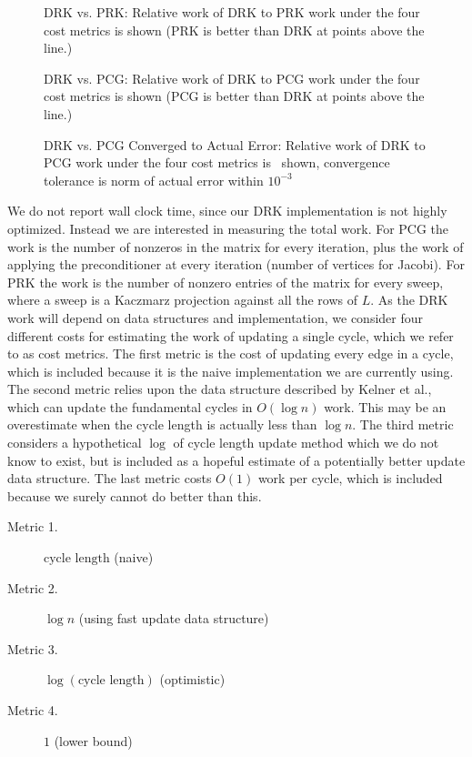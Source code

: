 \documentclass{sig-alternate}
\begin{document}
\begin{figure*}[htb!]
\centering
{}
\caption{DRK vs. PRK: Relative work of DRK to PRK work under the four cost
metrics is shown (PRK is better than DRK at points above the line.)\label{fig:prkworkcompare}}
\end{figure*}

\begin{figure*}[htb!]
\centering
{}
\caption{DRK vs. PCG: Relative work of DRK to PCG work under the four cost metrics
is shown
(PCG is better than DRK at points above the line.)\label{fig:pcgworkcompare}}
\end{figure*}

\begin{figure*}[htb!]
\centering
{}
\caption{DRK vs. PCG Converged to Actual Error: Relative work of DRK to PCG work under the four cost metrics is \
shown, convergence tolerance is norm of actual error within $10^{-3}$\label{fig:pcgactualerr}}
\end{figure*}


We do not report
wall clock time, since our DRK implementation is not highly optimized.
Instead we are interested in measuring the total work. For PCG the work is
the number of nonzeros in the matrix for every iteration, plus the work
of applying the preconditioner at every iteration
(number of vertices for Jacobi).
For PRK the work is the number of nonzero
entries of the matrix for every sweep,
where a sweep is a Kaczmarz projection against all the rows of $L$.
As the DRK work will depend on data structures and implementation,
we consider four different costs for estimating the work
of updating a single cycle, which we refer to as cost metrics.
The first metric is the cost of updating
every edge in a cycle, which is included
because it is the naive implementation
we are currently using. The second metric relies upon
the data structure described by Kelner et al., which can
update the fundamental cycles
in $O(\log{n})$ work.
This may be an overestimate when the cycle length is actually less than
$\log{n}$.
The third metric considers a
hypothetical $\log$ of cycle length update method
which we do not know to exist, but is included as a hopeful
estimate of a potentially better update data structure.
The last metric costs $O(1)$ work per cycle, which is
included because we surely cannot do better than this.
\begin{description}
\item[Metric 1.] $\text{cycle length}$ (naive)
\item[Metric 2.] $\log{n}$ (using fast update data structure)
\item[Metric 3.] $\log(\text{cycle length})$ (optimistic)
\item[Metric 4.] $1$ (lower bound)
\end{description}
\end{document}
